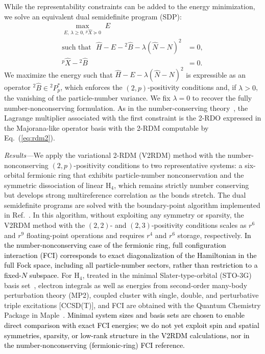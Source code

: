 \documentclass[aps,prl,floatfix,twocolumn,showpacs,10pt]{revtex4-2}
\begin{document}
While the representability constraints can be added to the energy minimization, we solve an equivalent dual semidefinite program (SDP):
\begin{align}
\max_{E, \, \lambda \ge 0,\,{}^{p}\!\hat X \succeq 0}\; E \qquad & \\
\text{such that~~}
\hat H - E - {}^{2}\!\hat B - \lambda(\hat N - N)^{2} &= 0, \\
{}^{p}\!\hat X - {}^{2}\!\hat B &= 0.
\end{align}
We maximize the energy such that $\hat H - E - \lambda(\hat N - N)^{2}$ is expressible as an operator ${}^{2}\!\hat B \in {}^{2}P^{*}_{p}$, which enforces the $(2,p)$-positivity conditions and, if $\lambda > 0$, the vanishing of the particle-number variance.  We fix $\lambda=0$ to recover the fully number-nonconserving formulation.  As in the number-conserving theory~\cite{Mazziotti.2023}, the Lagrange multiplier associated with the first constraint is the 2-RDO expressed in the Majorana-like operator basis with the 2-RDM computable by Eq.~(\ref{eq:rdm2}).

{\em Results---}We apply the variational 2-RDM (V2RDM) method with the number-nonconserving $(2,p)$-positivity conditions to two representative systems: a six-orbital fermionic ring that exhibits particle-number nonconservation and the symmetric dissociation of linear H$_4$, which remains strictly number conserving but develops strong multireference correlation as the bonds stretch.  The dual semidefinite programs are solved with the boundary-point algorithm implemented in Ref.~\cite{Mazziotti2011}.  In this algorithm, without exploiting any symmetry or sparsity, the V2RDM method with the $(2,2)$- and $(2,3)$-positivity conditions scales as $r^{6}$ and $r^{9}$ floating-point operations and requires $r^{4}$ and $r^{6}$ storage, respectively. \textcolor{black}{In the number-nonconserving case of the fermionic ring, full configuration interaction (FCI) corresponds to exact diagonalization of the Hamiltonian in the full Fock space, including all particle-number sectors, rather than restriction to a fixed-$N$ subspace.}  For H$_4$, treated in the minimal Slater-type-orbital (STO-3G) basis set~\cite{Hehre1969}, electron integrals as well as energies from second-order many-body perturbation theory (MP2), coupled cluster with single, double, and perturbative triple excitations [CCSD(T)], and FCI are obtained with the Quantum Chemistry Package in Maple~\cite{QCT2022}.  \textcolor{black}{Minimal system sizes and basis sets are chosen to enable direct comparison with exact FCI energies; we do not yet exploit spin and spatial symmetries, sparsity, or low-rank structure in the V2RDM calculations, nor in the number-nonconserving (fermionic-ring) FCI reference.}
\end{document}
